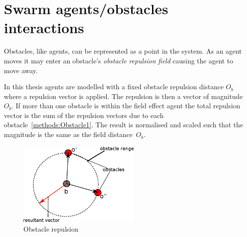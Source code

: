 \section{Swarm agents/obstacles interactions\label{section:ObstacleSection}}
Obstacles, like agents, can be represented as a point in the system. As an agent moves it may enter an obstacle's \textit{obstacle repulsion field} causing the agent to move away.

In this thesis agents are modelled with a fixed obstacle repulsion distance $O_b$ where a repulsion vector is applied. The repulsion is then a vector of magnitude $O_b$. If more than one obstacle is within the field effect agent the total repulsion vector is the sum of the repulsion vectors due to each obstacle~\autoref{methods:Obstacle1}. The result is normalised and scaled such that the magnitude is the same as the field distance~$O_b$.

\begin{figure}[H]
\begin{center}
\includegraphics[width=6cm]{CHAPTER-2/figures/Obstacle1}
\end{center}
\caption{Obstacle repulsion \label{methods:Obstacle1}}
\end{figure}




